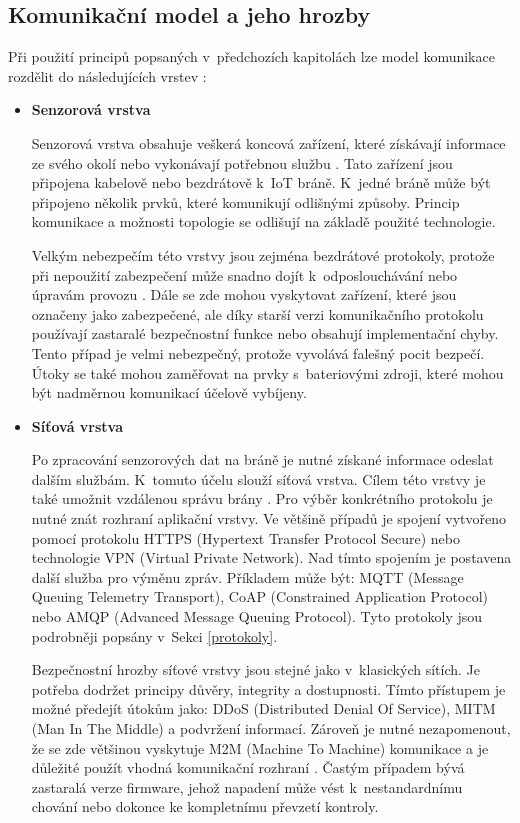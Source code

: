  \subsection{Komunikační model a jeho hrozby}
 Při použití principů popsaných v~předchozích kapitolách lze model komunikace rozdělit
 do následujících vrstev \cite{iotSurvey}:
 \begin{itemize}

 \item \textbf{Senzorová vrstva}
 
 Senzorová vrstva obsahuje veškerá koncová zařízení, které získávají informace ze svého
 okolí nebo vykonávají potřebnou službu \cite{secFramework}. Tato zařízení jsou připojena
 kabelově nebo bezdrátově k~IoT bráně. K~jedné bráně může být připojeno několik
 prvků, které komunikují odlišnými způsoby. Princip komunikace a možnosti topologie se odlišují
 na základě použité technologie.
 
 Velkým nebezpečím této vrstvy jsou zejména bezdrátové protokoly, protože při nepoužití
 zabezpečení může snadno dojít k~odposlouchávání nebo úpravám provozu \cite{iotSurvey}.
 Dále se zde mohou vyskytovat zařízení, které jsou označeny jako zabezpečené, 
 ale díky starší verzi komunikačního protokolu používají zastaralé bezpečnostní funkce
 nebo obsahují implementační chyby. 
 Tento případ je velmi nebezpečný, protože vyvolává falešný pocit bezpečí. Útoky se také mohou 
 zaměřovat na prvky s~bateriovými zdroji, které mohou být nadměrnou komunikací
 účelově vybíjeny.
 
 \item \textbf{Síťová vrstva}
 
  Po zpracování senzorových dat na bráně je nutné získané informace odeslat dalším
 službám. K~tomuto účelu slouží síťová vrstva. Cílem této vrstvy je také umožnit 
 vzdálenou správu brány \cite{secFramework}. Pro výběr konkrétního protokolu je 
 nutné znát rozhraní aplikační vrstvy. Ve většině případů je  spojení vytvořeno
 pomocí protokolu HTTPS (Hypertext Transfer Protocol Secure) nebo technologie
 VPN (Virtual Private Network). Nad tímto spojením je postavena další služba pro 
 výměnu zpráv. Příkladem může být: MQTT (Message Queuing Telemetry Transport),
 CoAP (Constrained Application Protocol) nebo
 AMQP (Advanced Message Queuing Protocol). Tyto protokoly jsou podrobněji popsány
v~Sekci \ref{protokoly}.
 
 Bezpečnostní hrozby síťové vrstvy jsou stejné jako v~klasických sítích. Je potřeba
 dodržet principy důvěry, integrity a dostupnosti. Tímto přístupem je možné
 předejít útokům jako: DDoS (Distributed Denial Of Service),
 MITM (Man In The Middle) a podvržení informací. Zároveň je nutné
 nezapomenout, že se zde většinou vyskytuje M2M (Machine To Machine)
 komunikace a je důležité použít 
 vhodná komunikační rozhraní \cite{iotSurvey}. Častým případem bývá zastaralá 
 verze firmware, jehož napadení může vést k~nestandardnímu chování nebo dokonce 
 ke kompletnímu převzetí kontroly. 
 

\end{itemize}
